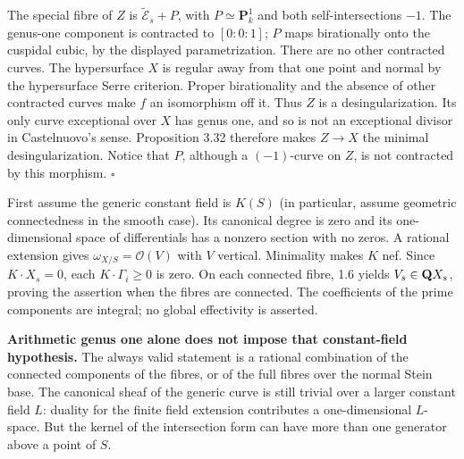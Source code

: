 \documentclass[11pt]{article}
\let\chapterexercise\exercise
\renewcommand{\exercise}[2]{\Needspace{8\baselineskip}\chapterexercise{#1}{#2}}
\begin{document}
The special fibre of $Z$ is $\widetilde{\mathcal E}_s+P$, with $P\simeq\mathbf P^1_k$ and both self-intersections $-1$. The genus-one component is contracted to $[0:0:1]$; $P$ maps birationally onto the cuspidal cubic, by the displayed parametrization. There are no other contracted curves. The hypersurface $X$ is regular away from that one point and normal by the hypersurface Serre criterion. Proper birationality and the absence of other contracted curves make $f$ an isomorphism off it. Thus $Z$ is a desingularization. Its only curve exceptional over $X$ has genus one, and so is not an exceptional divisor in Castelnuovo's sense. Proposition 3.32 therefore makes $Z\to X$ the minimal desingularization. Notice that $P$, although a $(-1)$-curve on $Z$, is not contracted by this morphism. \hfill$\square$

\pf First assume the generic constant field is $K(S)$ (in particular, assume geometric connectedness in the smooth case). Its canonical degree is zero and its one-dimensional space of differentials has a nonzero section with no zeros. A rational extension gives $\omega_{X/S}=\mathcal O(V)$ with $V$ vertical. Minimality makes $K$ nef. Since $K\cdot X_s=0$, each $K\cdot\Gamma_i\ge0$ is zero. On each connected fibre, 1.6 yields $V_s\in\mathbf Q X_s$, proving the assertion when the fibres are connected. The coefficients of the prime components are integral; no global effectivity is asserted.

\textbf{Arithmetic genus one alone does not impose that constant-field hypothesis.} The always valid statement is a rational combination of the connected components of the fibres, or of the full fibres over the normal Stein base. The canonical sheaf of the generic curve is still trivial over a larger constant field $L$: duality for the finite field extension contributes a one-dimensional $L$-space. But the kernel of the intersection form can have more than one generator above a point of $S$.
\end{document}
